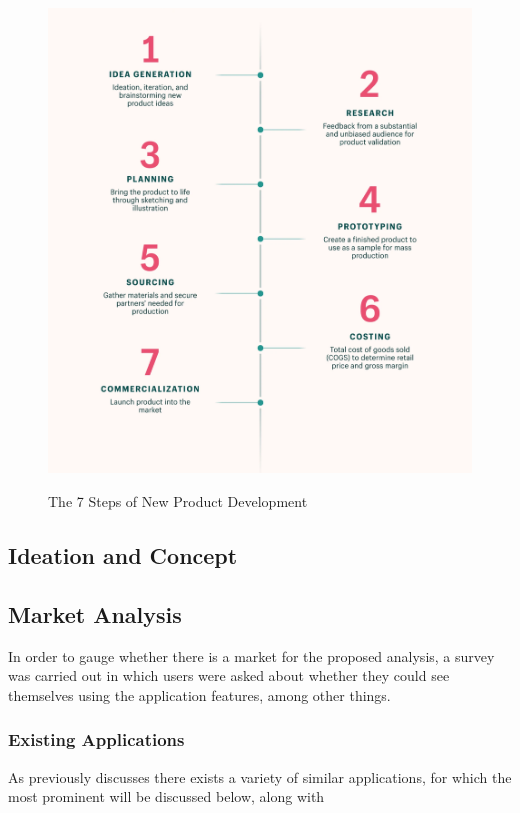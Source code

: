 \documentclass[12pt]{article}
\begin{document}
	\begin{figure}[H]
		\centering
		\includegraphics[scale=0.15]{images/npd.png}
		\caption{The 7 Steps of New Product Development}
		\label{fig:npd} \cite{shopify}
	\end{figure}
	
	
	\subsection{Ideation and Concept}
	\blindtext
	
	\subsection{Market Analysis}
	In order to gauge whether there is a market for the proposed analysis, a survey was carried out in which users were asked about whether they could see themselves using the application features, among other things.
	 
	\subsubsection{Existing Applications}
	As previously discusses there exists a variety of similar applications, for which the most prominent will be discussed below, along with
	
\end{document}
